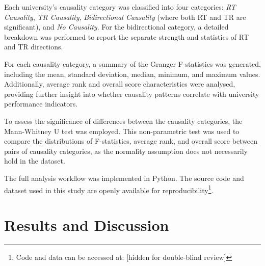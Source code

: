 \documentclass[a4paper, conference]{IEEEtran}
\begin{document}
Each university's causality category was classified into four categories: \textit{RT Causality}, \textit{TR Causality}, \textit{Bidirectional Causality} (where both RT and TR are significant), and \textit{No Causality}. For the bidirectional category, a detailed breakdown was performed to report the separate strength and statistics of RT and TR directions.

For each causality category, a summary of the Granger F-statistics was generated, including the mean, standard deviation, median, minimum, and maximum values. Additionally, average rank and overall score characteristics were analysed, providing further insight into whether causality patterns correlate with university performance indicators.

To assess the significance of differences between the causality categories, the Mann-Whitney U test \cite{mann1947test} was employed. This non-parametric test was used to compare the distributions of F-statistics, average rank, and overall score between pairs of causality categories, as the normality assumption does not necessarily hold in the dataset. 

The full analysis workflow was implemented in Python. The source code and dataset used in this study are openly available for reproducibility\footnote{Code and data can be accessed at:
		[hidden for double-blind review]
}.



\section{Results and Discussion}
\label{sec:results_and_discussion}
\end{document}
